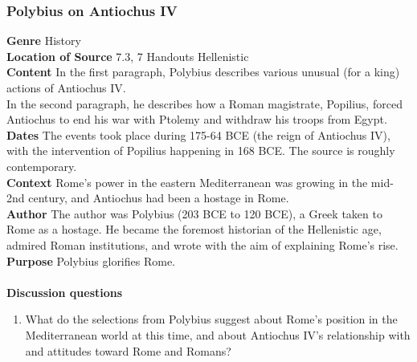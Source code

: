 \documentclass{article}
\begin{document}
\subsubsection*{Polybius on Antiochus IV}
\textbf{Genre}
History \\
\textbf{Location of Source}
7.3, 7 Handouts Hellenistic \\
\textbf{Content}
In the first paragraph, Polybius describes various unusual (for a king) actions of Antiochus IV. \\
In the second paragraph, he describes how a Roman magistrate, Popilius, forced Antiochus to end his war with Ptolemy and withdraw his troops from Egypt. \\
\textbf{Dates}
The events took place during 175-64 BCE (the reign of Antiochus IV), with the intervention of Popilius happening in 168 BCE. The source is roughly contemporary.  \\
\textbf{Context}
Rome’s power in the eastern Mediterranean was growing in the mid-2nd century, and Antiochus had been a hostage in Rome. \\
\textbf{Author}
The author was Polybius (203 BCE to 120 BCE), a Greek taken to Rome as a hostage.  He became the foremost historian of the Hellenistic age, admired Roman institutions, and wrote with the aim of explaining Rome’s rise. \\
\textbf{Purpose}
Polybius glorifies Rome. \\
\\
\textbf{Discussion questions}
\begin{enumerate}
  \item What do the selections from Polybius suggest about Rome’s position in the Mediterranean world at this time, and about Antiochus IV’s relationship with and attitudes toward Rome and Romans?
\end{enumerate}
\end{document}
